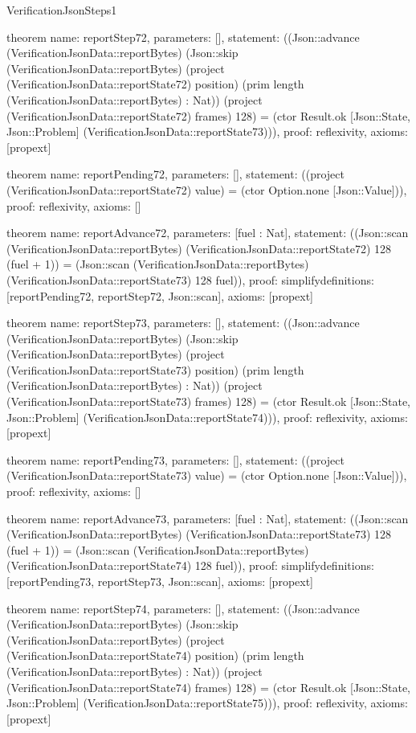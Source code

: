 \begin{lexlean}{VerificationJsonSteps1}
\begin{semanticmodule}
theorem{
  name: reportStep72,
  parameters: [],
  statement: ((Json::advance (VerificationJsonData::reportBytes) (Json::skip (VerificationJsonData::reportBytes) (project (VerificationJsonData::reportState72) position) (prim length (VerificationJsonData::reportBytes) : Nat)) (project (VerificationJsonData::reportState72) frames) 128) = (ctor Result.ok [Json::State, Json::Problem] (VerificationJsonData::reportState73))),
  proof: reflexivity{},
  axioms: [propext]
}

theorem{
  name: reportPending72,
  parameters: [],
  statement: ((project (VerificationJsonData::reportState72) value) = (ctor Option.none [Json::Value])),
  proof: reflexivity{},
  axioms: []
}

theorem{
  name: reportAdvance72,
  parameters: [fuel : Nat],
  statement: ((Json::scan (VerificationJsonData::reportBytes) (VerificationJsonData::reportState72) 128 (fuel + 1)) = (Json::scan (VerificationJsonData::reportBytes) (VerificationJsonData::reportState73) 128 fuel)),
  proof: simplify{definitions: [reportPending72, reportStep72, Json::scan]},
  axioms: [propext]
}

theorem{
  name: reportStep73,
  parameters: [],
  statement: ((Json::advance (VerificationJsonData::reportBytes) (Json::skip (VerificationJsonData::reportBytes) (project (VerificationJsonData::reportState73) position) (prim length (VerificationJsonData::reportBytes) : Nat)) (project (VerificationJsonData::reportState73) frames) 128) = (ctor Result.ok [Json::State, Json::Problem] (VerificationJsonData::reportState74))),
  proof: reflexivity{},
  axioms: [propext]
}

theorem{
  name: reportPending73,
  parameters: [],
  statement: ((project (VerificationJsonData::reportState73) value) = (ctor Option.none [Json::Value])),
  proof: reflexivity{},
  axioms: []
}

theorem{
  name: reportAdvance73,
  parameters: [fuel : Nat],
  statement: ((Json::scan (VerificationJsonData::reportBytes) (VerificationJsonData::reportState73) 128 (fuel + 1)) = (Json::scan (VerificationJsonData::reportBytes) (VerificationJsonData::reportState74) 128 fuel)),
  proof: simplify{definitions: [reportPending73, reportStep73, Json::scan]},
  axioms: [propext]
}

theorem{
  name: reportStep74,
  parameters: [],
  statement: ((Json::advance (VerificationJsonData::reportBytes) (Json::skip (VerificationJsonData::reportBytes) (project (VerificationJsonData::reportState74) position) (prim length (VerificationJsonData::reportBytes) : Nat)) (project (VerificationJsonData::reportState74) frames) 128) = (ctor Result.ok [Json::State, Json::Problem] (VerificationJsonData::reportState75))),
  proof: reflexivity{},
  axioms: [propext]
}


\end{semanticmodule}
\end{lexlean}
